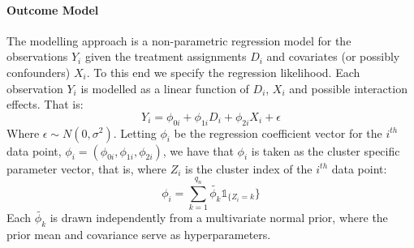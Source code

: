 \documentclass{article}
\begin{document}
\paragraph{Outcome Model}
The modelling approach is a non-parametric regression model for the observations $Y_i$ given the treatment assignments $D_i$ and covariates (or possibly confounders) $X_i$. To this end we specify the regression likelihood. Each observation $Y_i$ is modelled as a linear function of $D_i$, $X_i$ and possible interaction effects. That is:
\begin{equation}
    Y_i = \phi_{0i} + \phi_{1i}D_i + \phi_{2i}X_i + \epsilon
\label{reg_ll}
\end{equation}
Where $\epsilon \sim N(0,\sigma^2)$. Letting $\phi_i$ be the regression coefficient vector for the $i^{th}$ data point, $\phi_i = (\phi_{0i}, \phi_{1i}, \phi_{2i})$, we have that $\phi_i$ is taken as the cluster specific parameter vector, that is, where $Z_i$ is the cluster index of the $i^{th}$ data point:
\begin{equation}
    \phi_i = \sum_{k=1}^{q_n} \tilde{\phi_k} \mathbb{1}_{\{Z_i=k}\}
\end{equation}
Each $\tilde{\phi_k}$ is drawn independently from a multivariate normal prior, where the prior mean and covariance serve as hyperparameters.
\end{document}
